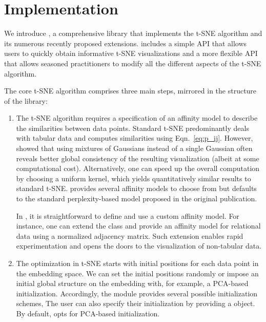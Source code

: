 \documentclass[article]{jss}
\newcommand{\opentsne}{\pkg{openTSNE}\xspace}
\begin{document}
\section{Implementation} \label{sec:implementation}

We introduce \opentsne, a comprehensive  library that implements the t-SNE algorithm and its numerous recently proposed extensions. \opentsne includes a simple API that allows users to quickly obtain informative t-SNE visualizations and a more flexible API that allows seasoned practitioners to modify all the different aspects of the t-SNE algorithm.

The core t-SNE algorithm comprises three main steps, mirrored in the structure of the \opentsne library:

\begin{enumerate}
\item The t-SNE algorithm requires a specification of an affinity model to describe the similarities between data points. Standard t-SNE predominantly deals with tabular data and computes similarities using Eqn.~\ref{eq:p_ij}. However, \citet{kobak2019art} showed that using mixtures of Gaussians instead of a single Gaussian often reveals better global consistency of the resulting visualization (albeit at some computational cost). Alternatively, one can speed up the overall computation by choosing a uniform kernel, which yields quantitatively similar results to standard t-SNE.  provides several affinity models to choose from but defaults to the standard perplexity-based model proposed in the original publication.

In \opentsne, it is straightforward to define and use a custom affinity model. For instance, one can extend the  class and provide an affinity model for relational data using a normalized adjacency matrix. Such extension enables rapid experimentation and opens the doors to the visualization of non-tabular data.  

\item The optimization in t-SNE starts with initial positions for each data point in the embedding space. We can set the initial positions randomly or impose an initial global structure on the embedding with, for example, a PCA-based initialization. Accordingly, the  module provides several possible initialization schemes, The user can also specify their initialization by providing a  object. By default, \opentsne opts for PCA-based initialization.


\end{enumerate}
\end{document}
